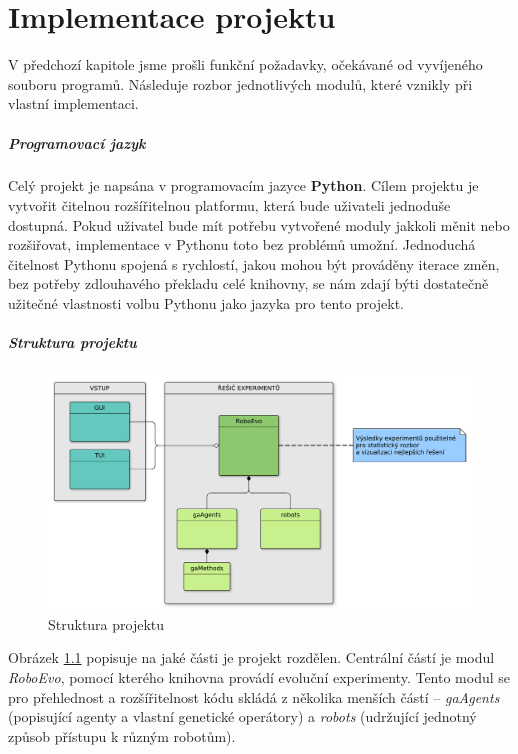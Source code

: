 \chapter{Implementace projektu} \label{chapter-implementace}
V předchozí kapitole jsme prošli funkční požadavky, očekávané od vyvíjeného
souboru programů. Následuje rozbor jednotlivých modulů, které vznikly při
vlastní implementaci. 

\paragraph{Programovací jazyk}
Celý projekt je napsána v programovacím jazyce \textbf{Python}. Cílem projektu
je vytvořit čitelnou rozšířitelnou platformu, která bude uživateli jednoduše
dostupná. Pokud uživatel bude mít potřebu vytvořené moduly jakkoli měnit nebo
rozšiřovat, implementace v Pythonu toto bez problémů umožní. Jednoduchá čitelnost Pythonu
spojená s rychlostí, jakou mohou být prováděny iterace změn, bez potřeby
zdlouhavého překladu celé knihovny, se nám zdají býti dostatečně užitečné
vlastnosti volbu Pythonu jako jazyka pro tento projekt.

\paragraph{Struktura projektu}

\begin{figure}[!htb]
    \centering
    \includegraphics[width=1\textwidth]{../img/BP_imp_graph.pdf}
    \caption{Struktura projektu}
    \label{fig:struktura}
\end{figure}

Obrázek \ref{fig:struktura} popisuje na jaké části je projekt rozdělen.
Centrální částí je modul \emph{RoboEvo}, pomocí kterého knihovna provádí
evoluční experimenty. Tento modul se pro přehlednost a rozšířitelnost kódu
skládá z několika menších částí -- \emph{gaAgents} (popisující agenty a vlastní
genetické operátory) a \emph{robots} (udržující jednotný způsob přístupu k
různým robotům). 

